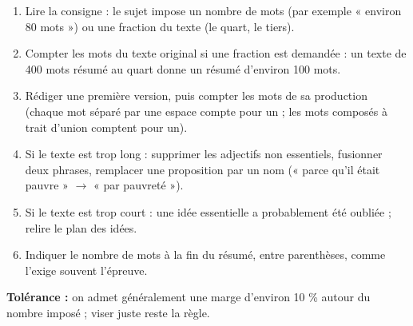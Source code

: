 \documentclass[11pt]{article}
\newcommand{\cle}[1]{{\popxbold\color{popdark}#1}}
\begin{document}
\begin{methode}
\begin{enumerate}
\item Lire la \cle{consigne} : le sujet impose un nombre de mots (par exemple « environ 80 mots ») ou une fraction du texte (le quart, le tiers).
\item Compter les mots du texte original si une fraction est demandée : un texte de 400 mots résumé au quart donne un résumé d'environ 100 mots.
\item Rédiger une première version, puis \cle{compter les mots} de sa production (chaque mot séparé par une espace compte pour un ; les mots composés à trait d'union comptent pour un).
\item Si le texte est trop long : supprimer les adjectifs non essentiels, fusionner deux phrases, remplacer une proposition par un nom (« parce qu'il était pauvre » $\rightarrow$ « par pauvreté »).
\item Si le texte est trop court : une idée essentielle a probablement été oubliée ; relire le plan des idées.
\item Indiquer le \cle{nombre de mots} à la fin du résumé, entre parenthèses, comme l'exige souvent l'épreuve.
\end{enumerate}
\textbf{Tolérance :} on admet généralement une marge d'environ 10 \% autour du nombre imposé ; viser juste reste la règle.
\end{methode}
\end{document}
